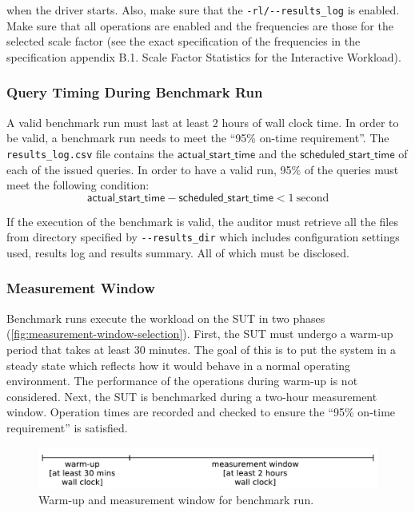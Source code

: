 \begin{description}
    when the driver starts. Also, make sure that the \verb|-rl/--results_log| is enabled. Make sure that all operations are enabled and the frequencies are those for the selected scale factor (see the exact specification of the frequencies in the specification appendix B.1. Scale Factor Statistics for the Interactive Workload).
\end{description}

\subsubsection{Query Timing During Benchmark Run}
\label{sec:ontime-requirements}
A valid benchmark run must last at least 2 hours of wall clock time.
In order to be valid, a benchmark run needs to meet the ``95\% on-time requirement''.
The \texttt{results\_log.csv} file contains the $\mathsf{actual\_start\_time}$ and the $\mathsf{scheduled\_start\_time}$ of each of the issued queries. In order to have a valid run, 95\% of the queries must meet the following condition:
\begin{equation*}
\mathsf{actual\_start\_time} - \mathsf{scheduled\_start\_time} < 1\
\mathrm{second}
\end{equation*}

If the execution of the benchmark is valid, the auditor must retrieve all the files from directory specified by \verb|--results_dir| which includes configuration settings used, results log and results summary. All of which must be disclosed.

\subsubsection{Measurement Window}
\label{sec:measurement-window}

Benchmark runs execute the workload on the SUT in two phases (\autoref{fig:measurement-window-selection}).
First, the SUT must undergo a warm-up period that takes at least 30 minutes. The goal of this is to put the system in a steady state which reflects how it would behave in a normal operating environment. The performance of the operations during warm-up is not considered.
Next, the SUT is benchmarked during a two-hour measurement window. Operation times are recorded and checked to ensure the ``95\% on-time requirement'' is satisfied.

\begin{figure}[h]
    \centering
    \includegraphics[width=.7\linewidth]{figures/measurement-window-selection}
    \caption{Warm-up and measurement window for benchmark run.}
    \label{fig:measurement-window-selection}
\end{figure}

